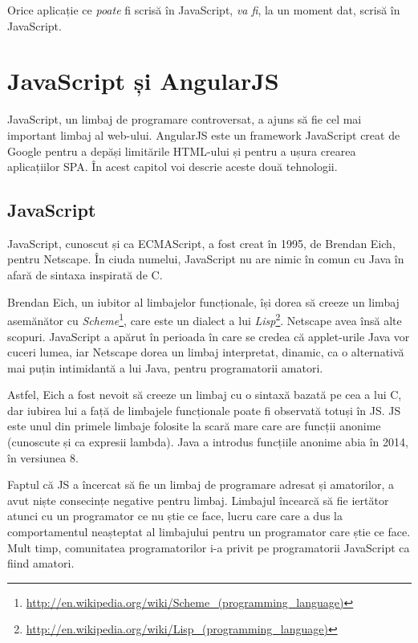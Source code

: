 \begin{savequote}[75mm]
Orice aplicație ce \emph{poate} fi scrisă în JavaScript, \emph{va fi},
la un moment dat, scrisă în JavaScript.
\end{savequote}

\chapter{JavaScript și AngularJS}

JavaScript, un limbaj de programare controversat, a ajuns să fie 
cel mai important limbaj al web-ului. AngularJS este un framework
JavaScript creat de Google pentru a depăși limitările HTML-ului și pentru a
ușura crearea aplicațiilor SPA. În acest capitol voi descrie aceste
două tehnologii.


\section{JavaScript}

JavaScript, cunoscut și ca ECMAScript, a fost creat în 1995, 
de Brendan Eich, pentru Netscape. În ciuda
numelui, JavaScript nu are nimic în comun cu Java în afară de sintaxa
inspirată de C.

Brendan Eich, un iubitor al limbajelor funcționale, își dorea să creeze
un limbaj asemănător cu \emph{Scheme}\footnote{\url{http://en.wikipedia.org/wiki/Scheme\_(programming\_language)}}, care este un dialect a lui 
\emph{Lisp}\footnote{\url{http://en.wikipedia.org/wiki/Lisp\_(programming_language)}}. 
Netscape avea însă alte scopuri. JavaScript a apărut în perioada în care
se credea că applet-urile Java vor cuceri lumea, iar Netscape dorea un limbaj
interpretat, dinamic, ca o alternativă mai puțin intimidantă a lui Java,
pentru programatorii amatori.

Astfel, Eich a fost nevoit să creeze un limbaj cu o sintaxă bazată pe cea
a lui C, dar iubirea lui a față de limbajele funcționale poate fi observată
totuși în JS. JS este unul din primele limbaje folosite la scară mare
care are funcții anonime (cunoscute și ca expresii lambda). Java a introdus
funcțiile anonime abia în 2014, în versiunea 8.

Faptul că JS a încercat să fie un limbaj de programare adresat
și amatorilor, a avut niște consecințe negative pentru limbaj.
Limbajul încearcă să fie iertător atunci cu un programator ce
nu știe ce face, lucru care care a dus la comportamentul neașteptat
al limbajului pentru un programator care știe ce face.
Mult timp, comunitatea programatorilor
i-a privit pe programatorii JavaScript ca fiind amatori.

